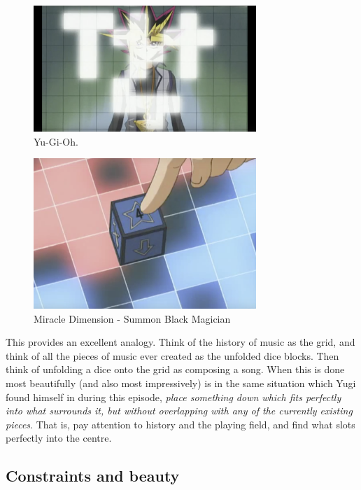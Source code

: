\documentclass[12pt]{book}
\theoremstyle{plain}
\theoremstyle{definition}
\begin{document}
\begin{figure}[h]
	\label{fig:YGOne}
	\caption{Yu-Gi-Oh.}
	\centering
	\includegraphics[width=0.75\textwidth]{YuGiOne.png}
	\end{figure}
\begin{figure}[h]
	\label{fig:YGTwo}
	\caption{Miracle Dimension - Summon Black Magician}
	\centering
	\includegraphics[width=0.75\textwidth]{YuGiTwo.png}
	\end{figure}

This provides an excellent analogy. Think of the history of music as the grid, and think of all the pieces of music ever created as the unfolded dice blocks. Then think of unfolding a dice onto the grid as composing a song. When this is done most beautifully (and also most impressively) is in the same situation which Yugi found himself in during this episode, \emph{place something down which fits perfectly into what surrounds it, but without overlapping with any of the currently existing pieces}. That is, pay attention to history and the playing field, and find what slots perfectly into the centre.

\subsection{Constraints and beauty}
\end{document}
